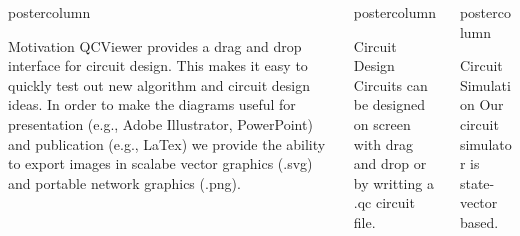 \documentclass[final]{beamer} %
\begin{document}
\begin{frame}{}
\begin{columns}
\begin{column}{.33\textwidth}
\begin{beamercolorbox}[center,wd=\textwidth]{postercolumn}
\begin{minipage}[T]{.95\textwidth}
\begin{block}{\large Motivation}
             QCViewer provides a drag and drop interface for circuit design. This makes it easy to quickly 
             test out new algorithm and circuit design ideas. In order to make the diagrams useful for presentation 
             (e.g., Adobe Illustrator, PowerPoint) and publication (e.g., LaTex) we provide the ability to export 
             images in scalabe vector graphics (.svg) and portable network graphics (.png).
           \end{block}
         \end{minipage}
      \end{beamercolorbox}
    \end{column}
    \begin{column}{.33\textwidth}
      \begin{beamercolorbox}[center,wd=\textwidth]{postercolumn}
         \begin{minipage}[T]{.95\textwidth}
           \begin{block}{\large Circuit Design}
             Circuits can be designed on screen with drag and drop or by writting a .qc circuit file.
           \end{block}
         \end{minipage}
      \end{beamercolorbox}
    \end{column}
    \begin{column}{.33\textwidth}
      \begin{beamercolorbox}[center,wd=\textwidth]{postercolumn}
         \begin{minipage}[T]{.95\textwidth}
           \begin{block}{\large Circuit Simulation}
              Our circuit simulator is state-vector based.
           \end{block}
         \end{minipage}
      \end{beamercolorbox}
    \end{column}
  \end{columns}
  \end{frame}
\end{document}
